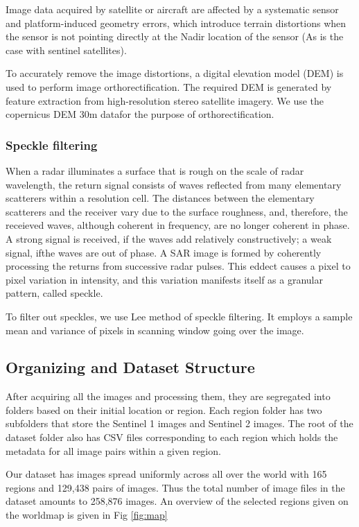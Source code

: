 Image data acquired by satellite or aircraft are affected by a systematic sensor and platform-induced geometry errors, which introduce terrain distortions when the sensor is not pointing directly at the Nadir location of the sensor (As is the case with sentinel satellites).

To accurately remove the image distortions, a digital elevation model (DEM) is used to perform image orthorectification. The required DEM is generated by feature extraction from high-resolution stereo satellite imagery. We use the copernicus DEM 30m datafor the purpose of orthorectification.

\subsubsection{Speckle filtering}

When a radar illuminates a surface that is rough on the scale of radar wavelength, the return signal consists of waves reflected from many elementary scatterers within a resolution cell. The distances between the elementary scatterers and the receiver vary due to the surface roughness, and, therefore, the receieved waves, although coherent in frequency, are no longer coherent in phase. A strong signal is received, if the waves add relatively constructively; a weak signal, ifthe waves are out of phase. A SAR image is formed by coherently processing the returns from successive radar pulses. This eddect causes a pixel to pixel variation in intensity, and this variation manifests itself as a granular pattern, called speckle\cite{SpeckleLee}.

To filter out speckles, we use Lee method of speckle filtering. It employs a sample mean and variance of pixels in scanning window going over the image.

\subsection{Organizing and Dataset Structure}

After acquiring all the images and processing them, they are segregated into folders based on their initial location or region. Each region folder has two subfolders that store the Sentinel 1 images and Sentinel 2 images. The root of the dataset folder also has CSV files corresponding to each region which holds the metadata for all image pairs within a given region.

Our dataset has images spread uniformly across all over the world with 165 regions and 129,438 pairs of images. Thus the total number of image files in the dataset amounts to 258,876 images. An overview of the selected regions given on the worldmap is given in Fig \ref{fig:map}


